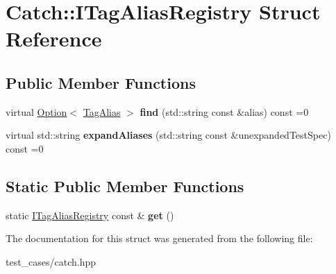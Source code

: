 \hypertarget{structCatch_1_1ITagAliasRegistry}{}\section{Catch\+:\+:I\+Tag\+Alias\+Registry Struct Reference}
\label{structCatch_1_1ITagAliasRegistry}
\subsection*{Public Member Functions}
\begin{DoxyCompactItemize}
\item 
\mbox{\label{structCatch_1_1ITagAliasRegistry_a7d2fba4d39cfcc62c2695fcde4f989c3}} 
virtual \hyperlink{classCatch_1_1Option}{Option}$<$ \hyperlink{structCatch_1_1TagAlias}{Tag\+Alias} $>$ {\bfseries find} (std\+::string const \&alias) const =0
\item 
\mbox{\label{structCatch_1_1ITagAliasRegistry_ae729a7532faf7466db1a157ce0395170}} 
virtual std\+::string {\bfseries expand\+Aliases} (std\+::string const \&unexpanded\+Test\+Spec) const =0
\end{DoxyCompactItemize}
\subsection*{Static Public Member Functions}
\begin{DoxyCompactItemize}
\item 
\mbox{\label{structCatch_1_1ITagAliasRegistry_aa9d0f008f49473389c7abf6071f137a7}} 
static \hyperlink{structCatch_1_1ITagAliasRegistry}{I\+Tag\+Alias\+Registry} const  \& {\bfseries get} ()
\end{DoxyCompactItemize}


The documentation for this struct was generated from the following file\+:\begin{DoxyCompactItemize}
\item 
test\+\_\+cases/catch.\+hpp\end{DoxyCompactItemize}
